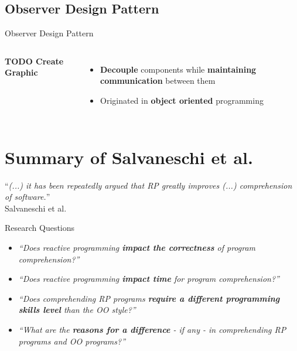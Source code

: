 \documentclass{beamer}
\begin{document}
\subsection*{Observer Design Pattern}
\begin{frame}{Observer Design Pattern \cite{gamma1995design}}
	\begin{columns}[t, onlytextwidth]
			\textbf{TODO Create Graphic}

			\begin{itemize}
				\item \textbf{Decouple} components while \textbf{maintaining communication} between them\bigskip
				\item Originated in \textbf{object oriented} programming\bigskip
			\end{itemize}
	\end{columns}
\end{frame}



\section{Summary of Salvaneschi et al.}


\begin{frame}[focus]
	``\emph{(...) it has been repeatedly argued that RP greatly improves (...) comprehension of software.}''
	\\\bigskip
	\small{Salvaneschi et al. \cite{7827078}}
\end{frame}


\begin{frame}{Research Questions \cite{7827078}}
	\begin{itemize}
		\item \emph{``Does reactive programming \textbf{impact the correctness} of program comprehension?''}\bigskip
		\item \emph{``Does reactive programming \textbf{impact time} for program comprehension?''}\bigskip
		\item \emph{``Does comprehending RP programs \textbf{require a different programming skills level} than the OO style?''}\bigskip
		\item \emph{``What are the \textbf{reasons for a difference} - if any - in comprehending RP programs and OO programs?''}
	\end{itemize}
\end{frame}
\end{document}
